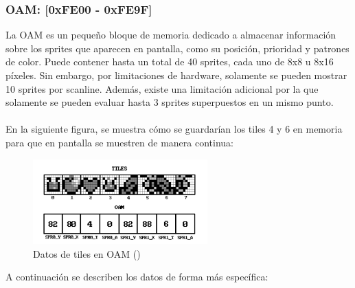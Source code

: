 \subsubsection{OAM: [0xFE00 - 0xFE9F]}\label{mem:oam}
La OAM es un pequeño bloque de memoria dedicado a almacenar información sobre los sprites que aparecen en pantalla, como su posición, prioridad y patrones de color. Puede contener hasta un total de 40 sprites, cada uno de 8x8 u 8x16 píxeles. Sin embargo, por limitaciones de hardware, solamente se pueden mostrar 10 sprites por scanline. Además, existe una limitación adicional por la que solamente se pueden evaluar hasta 3 sprites superpuestos en un mismo punto.
\\\\
En la siguiente figura, se muestra cómo se guardarían los tiles 4 y 6 en memoria para que en pantalla se muestren de manera continua:

\begin{figure}[H]
    \centering
    \includegraphics[width=0.6\textwidth]{include/images/oam_tiles.png}
    \caption{Datos de tiles en OAM (\cite{goldensacra})}
    \label{figure:oam_tiles}
\end{figure}

A continuación se describen los datos de forma más específica:

